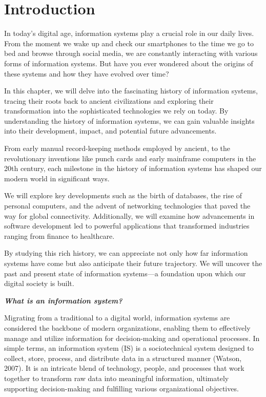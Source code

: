 \documentclass[
  letterpaper,
  DIV=11,
  numbers=noendperiod]{scrreprt}
\begin{document}

\chapter{Introduction}\label{introduction-1}

In today's digital age, information systems play a crucial role in our
daily lives. From the moment we wake up and check our smartphones to the
time we go to bed and browse through social media, we are constantly
interacting with various forms of information systems. But have you ever
wondered about the origins of these systems and how they have evolved
over time?

In this chapter, we will delve into the fascinating history of
information systems, tracing their roots back to ancient civilizations
and exploring their transformation into the sophisticated technologies
we rely on today. By understanding the history of information systems,
we can gain valuable insights into their development, impact, and
potential future advancements.

From early manual record-keeping methods employed by ancient, to the
revolutionary inventions like punch cards and early mainframe computers
in the 20th century, each milestone in the history of information
systems has shaped our modern world in significant ways.

We will explore key developments such as the birth of databases, the
rise of personal computers, and the advent of networking technologies
that paved the way for global connectivity. Additionally, we will
examine how advancements in software development led to powerful
applications that transformed industries ranging from finance to
healthcare.

By studying this rich history, we can appreciate not only how far
information systems have come but also anticipate their future
trajectory. We will uncover the past and present state of information
systems---a foundation upon which our digital society is built.

\textbf{\emph{What is an information system?}}

Migrating from a traditional to a digital world, information systems are
considered the backbone of modern organizations, enabling them to
effectively manage and utilize information for decision-making and
operational processes. In simple terms, an information system (IS) is a
sociotechnical system designed to collect, store, process, and
distribute data in a structured manner (Watson, 2007). It is an
intricate blend of technology, people, and processes that work together
to transform raw data into meaningful information, ultimately supporting
decision-making and fulfilling various organizational objectives.
\end{document}
